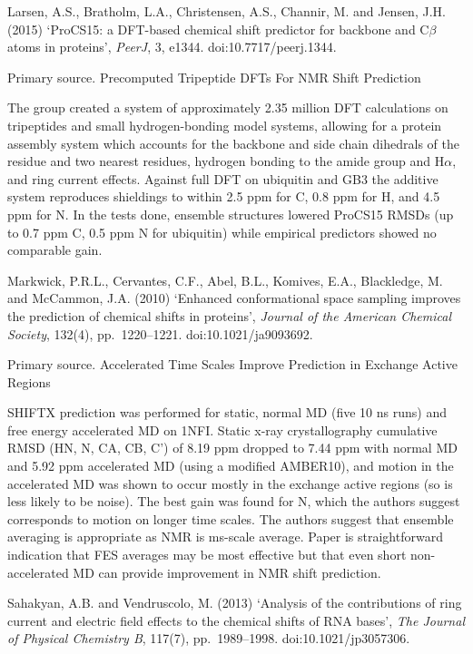 \documentclass[11pt,a4paper]{article}
\begin{document}
\medskip

Larsen, A.S., Bratholm, L.A., Christensen, A.S., Channir, M. and Jensen, J.H. (2015) `ProCS15: a DFT-based chemical shift predictor for backbone and C$\beta$ atoms in proteins', \textit{PeerJ}, 3, e1344. doi:10.7717/peerj.1344.

Primary source. Precomputed Tripeptide DFTs For NMR Shift Prediction

The group created a system of approximately 2.35 million DFT calculations on tripeptides and small hydrogen-bonding model systems, allowing for a protein assembly system which accounts for the backbone and side chain dihedrals of the residue and two nearest residues, hydrogen bonding to the amide group and H$\alpha$, and ring current effects. Against full DFT on ubiquitin and GB3 the additive system reproduces shieldings to within 2.5 ppm for C, 0.8 ppm for H, and 4.5 ppm for N. In the tests done, ensemble structures lowered ProCS15 RMSDs (up to 0.7 ppm C, 0.5 ppm N for ubiquitin) while empirical predictors showed no comparable gain.

\medskip

Markwick, P.R.L., Cervantes, C.F., Abel, B.L., Komives, E.A., Blackledge, M. and McCammon, J.A. (2010) `Enhanced conformational space sampling improves the prediction of chemical shifts in proteins', \textit{Journal of the American Chemical Society}, 132(4), pp.~1220--1221. doi:10.1021/ja9093692.

Primary source. Accelerated Time Scales Improve Prediction in Exchange Active Regions

SHIFTX prediction was performed for static, normal MD (five 10 ns runs) and free energy accelerated MD on 1NFI. Static x-ray crystallography cumulative RMSD (HN, N, CA, CB, C') of 8.19 ppm dropped to 7.44 ppm with normal MD and 5.92 ppm accelerated MD (using a modified AMBER10), and motion in the accelerated MD was shown to occur mostly in the exchange active regions (so is less likely to be noise). The best gain was found for N, which the authors suggest corresponds to motion on longer time scales. The authors suggest that ensemble averaging is appropriate as NMR is ms-scale average. Paper is straightforward indication that FES averages may be most effective but that even short non-accelerated MD can provide improvement in NMR shift prediction.

\medskip

Sahakyan, A.B. and Vendruscolo, M. (2013) `Analysis of the contributions of ring current and electric field effects to the chemical shifts of RNA bases', \textit{The Journal of Physical Chemistry B}, 117(7), pp.~1989--1998. doi:10.1021/jp3057306.
\end{document}
